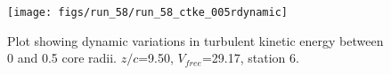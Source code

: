 \begin{figure}[H]
\centering
\texttt{[image: figs/run\_58/run\_58\_ctke\_005rdynamic]}
\caption{Plot showing dynamic variations in turbulent kinetic energy between 0 and 0.5 core radii. $z/c$=9.50, $V_{free}$=29.17, station 6.}
\label{fig:run_58_ctke_005rdynamic}
\end{figure}



